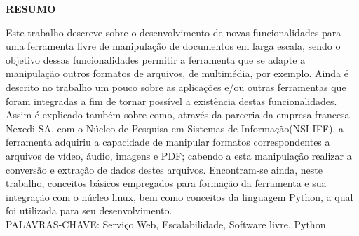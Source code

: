 \begin{center}
\textbf{RESUMO}
\end{center}
\singlespacing

\noindent Este trabalho descreve sobre o desenvolvimento de novas funcionalidades para uma ferramenta livre de manipulação de documentos em larga escala, sendo o objetivo dessas funcionalidades permitir a ferramenta que se adapte a manipulação outros formatos de arquivos, de multimédia, por exemplo. Ainda é descrito no trabalho um pouco sobre as aplicações e/ou outras ferramentas que foram integradas a fim de tornar possível a existência destas funcionalidades. Assim é explicado também sobre como, através da parceria da empresa francesa Nexedi SA, com o Núcleo de Pesquisa em Sistemas de Informação(NSI-IFF), a ferramenta adquiriu a capacidade de manipular formatos correspondentes a arquivos de vídeo, áudio, imagens e PDF; cabendo a esta manipulação realizar a conversão e extração de dados destes arquivos. Encontram-se ainda, neste trabalho, conceitos básicos empregados para formação da ferramenta e sua integração com o núcleo linux, bem como conceitos da linguagem Python, a qual foi utilizada para seu desenvolvimento. \\

\noindent PALAVRAS-CHAVE:  Serviço Web, Escalabilidade, Software livre, Python

